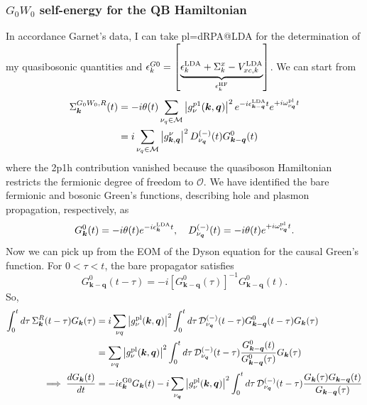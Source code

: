 \subsubsection{$G_0W_0$ self-energy for the QB Hamiltonian}
 In accordance Garnet's data, I can take pl=dRPA@LDA for the determination of my quasibosonic quantities and $\epsilon_k^{G0}=\left[\underbrace{\epsilon_k^{\mathrm{LDA}}+\Sigma_k^x-V_{x c, k}^{\mathrm{LDA}}}_{\epsilon_k^{\rm HF}}\right]$. We can start from
\begin{align}
\Sigma_{\bm{k}}^{G_0W_0,R}(t) &= -i \theta(t) \sum_{\nu_q\in \mathcal{M}}\left|g_\nu^{p 1}(\bm{k},\bm{q})\right|^2 e^{-i \epsilon_{\bm{k}-\bm{q}}^{\rm LDA} t} e^{+i \omega_{\nu_{\bm{q}}}^{\rm pl} t} \\
&= i  \sum_{\nu_q\in\mathcal M} \left|g^\nu_{\bm{k},\bm{q}}\right|^2D_{\nu_{\bm{q}}}^{(-)}(t) G_{\bm{k}-\bm{q}}^0(t)
\end{align}
where the 2p1h contribution vanished because the quasiboson Hamiltonian restricts the fermionic degree of freedom to $\mathcal{O}$. We have identified the bare fermionic and bosonic Green's functions, describing hole and plasmon propagation, respectively, as
\begin{equation}
    G_{\bm{k}}^{0}(t)
    =
    -i\theta(t)e^{-i\epsilon_{\bm{k}}^{\rm LDA}t}, \quad D_{\nu_{\bm{q}}}^{(-)}(t)=-i \theta(t) e^{+i \omega_{\nu_{\bm{q}}}^{\rm pl} t}.
\end{equation}
Now we can pick up from the EOM of the Dyson equation for the causal Green's function. For $0<\tau<t$, the bare propagator satisfies
\begin{equation}
G_{\bm{k}-\bm{q}}^{0}(t-\tau)
=
-i
\left[G_{\bm{k}-\bm{q}}^{0}(\tau)\right]^{-1}
G_{\bm{k}-\bm{q}}^{0}(t).
\end{equation}
So,
\begin{align}
\int_0^t d\tau\,
\Sigma_{\bm{k}}^{R}(t-\tau)G_{\bm{k}}(\tau)
&=
i\sum_{\nu q}
\left|g_\nu^{\rm pl}(\bm{k},\bm{q})\right|^2
\int_0^t d\tau\,
\mathcal D_{\nu_{\bm q}}^{(-)}(t-\tau)
G_{\bm{k}-\bm{q}}^{0}(t-\tau)
G_{\bm{k}}(\tau)
\\
&=
\sum_{\nu q}
\left|g_\nu^{\rm pl}(\bm{k},\bm{q})\right|^2
\int_0^t d\tau\,
\mathcal D_{\nu_{\bm q}}^{(-)}(t-\tau)
\frac{G_{\bm{k}-\bm{q}}^{0}(t)}
     {G_{\bm{k}-\bm{q}}^{0}(\tau)}
G_{\bm{k}}(\tau)\\
\implies \frac{dG_{\bm{k}}(t)}{dt}
&=
-i\epsilon_{\bm{k}}^{\rm G0}G_{\bm{k}}(t)
-i
\sum_{\nu_{\bm q}}
\left|g_\nu^{\rm pl}(\bm{k},\bm{q})\right|^2
\int_0^t d\tau\,
\mathcal D_{\nu_{\bm q}}^{(-)}(t-\tau)
\frac{
G_{\bm{k}}(\tau)G_{\bm{k}-\bm{q}}(t)
}{
G_{\bm{k}-\bm{q}}(\tau)
}
\end{align}
